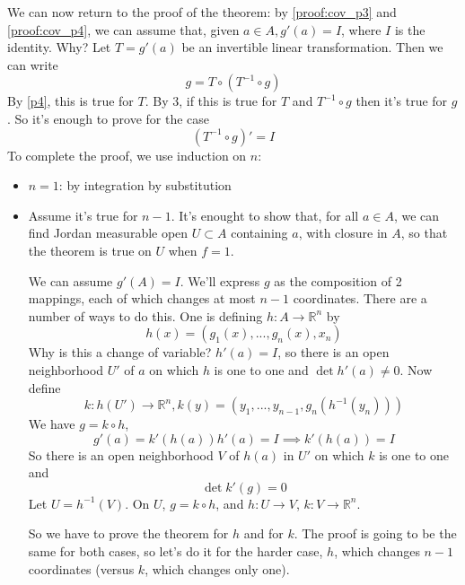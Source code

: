 \documentclass{article}
\newcommand{\reals}[0]{\mathbb{R}}
\begin{document}
We can now return to the proof of the theorem: by \ref{proof:cov_p3} and \ref{proof:cov_p4}, we can assume that, given \(a \in A, g'(a) = I\), where \(I\) is the identity. Why? Let \(T = g'(a)\) be an invertible linear transformation. Then we can write
\begin{equation}
  g = T \circ (T^{-1} \circ g)
\end{equation}
By \ref{p4}, this is true for \(T\). By 3, if this is true for \(T\) and \(T^{-1} \circ g\) then it's true for \(g\). So it's enough to prove for the case
\begin{equation}
    (T^{-1} \circ g)' = I
\end{equation}
To complete the proof, we use induction on \(n\):
\begin{itemize}

  \item \(n = 1\): by integration by substitution

  \item Assume it's true for \(n - 1\). It's enought to show that, for all \(a \in A\), we can find Jordan measurable open \(U \subset A\) containing \(a\), with closure in \(A\), so that the theorem is true on \(U\) when \(f = 1\).

  We can assume \(g'(A) = I\). We'll express \(g\) as the composition of 2 mappings, each of which changes at most \(n - 1\) coordinates. There are a number of ways to do this. One is defining \(h : A \to \reals^n\) by
  \begin{equation}
    h(x) = (g_1(x),...,g_n(x), x_n)
  \end{equation}
  Why is this a change of variable? \(h'(a) = I\), so there is an open neighborhood \(U'\) of \(a\) on which \(h\) is one to one and \(\det h'(a) \neq 0\). Now define
  \begin{equation}
    k: h(U') \to \reals^n, k(y) = (y_1,...,y_{n - 1}, g_n(h^{-1}(y_n)))
  \end{equation}
  We have \(g = k \circ h\),
  \begin{equation}
    g'(a) = k'(h(a))h'(a) = I \implies k'(h(a)) = I
  \end{equation}
  So there is an open neighborhood \(V\) of \(h(a)\) in \(U'\) on which \(k\) is one to one and
  \begin{equation}
    \det k'(g) = 0
  \end{equation}
  Let \(U = h^{-1}(V)\). On \(U\), \(g = k \circ h\), and \(h: U \to V\), \(k: V \to \reals^n\).

  So we have to prove the theorem for \(h\) and for \(k\). The proof is going to be the same for both cases, so let's do it for the harder case, \(h\), which changes \(n - 1\) coordinates (versus \(k\), which changes only one).


\end{itemize}
\end{document}
